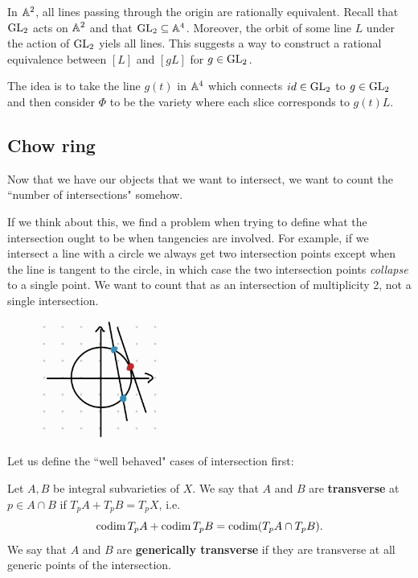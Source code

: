 \begin{example}
In $\mathbb{A}^2$, all lines passing through the origin are rationally equivalent.
Recall that $\mathrm{GL}_2$ acts on $\mathbb{A}^2$ and that $\mathrm{GL}_2\subseteq \mathbb{A}^4$. Moreover, the orbit of some line $L$ under the action of $\mathrm{GL}_2$ yiels all lines. This suggests a way to construct a rational equivalence between $[L]$ and $[gL]$ for $g\in \mathrm{GL}_2$.

The idea is to take the line $g(t)$ in $\mathbb{A}^4$ which connects $id\in \mathrm{GL}_2$ to $g\in \mathrm{GL}_2$ and then consider $\Phi$ to be the variety where each slice corresponds to $g(t)L$.
\end{example}


\subsection{Chow ring}
Now that we have our objects that we want to intersect, we want to count the ``number of intersections" somehow. 

If we think about this, we find a problem when trying to define what the intersection ought to be when tangencies are involved. For example, if we intersect a line with a circle we always get two intersection points except when the line is tangent to the circle, in which case the two intersection points \textit{collapse} to a single point. We want to count that as an intersection of multiplicity 2, not a single intersection.

\begin{figure}[!htb]
	\centering
	\includegraphics[width=4cm]{Images/tangent-moves-to-transverse.png}
\end{figure}

Let us define the ``well behaved" cases of intersection first:

\begin{definition}[]
Let $A,B$ be integral subvarieties of $X$. We say that $A$ and $B$ are \textbf{transverse} at $p\in A\cap B$ if $T_pA+T_pB=T_pX$, i.e. 
\[\operatorname{codim} T_p A+\operatorname{codim} T_p B=\operatorname{codim}(T_pA\cap T_p B).\]
We say that $A$ and $B$ are \textbf{generically transverse} if they are transverse at all generic points of the intersection.
\end{definition}


